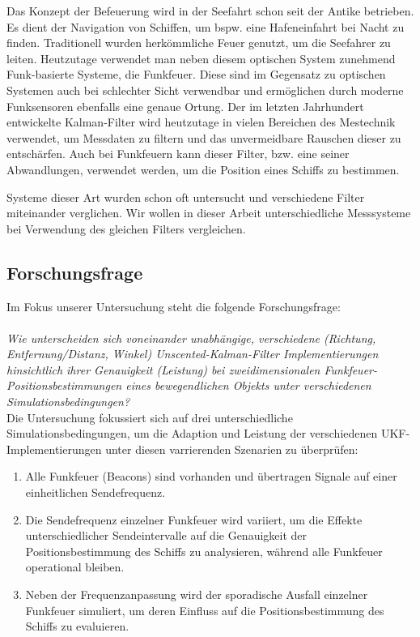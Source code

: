 \documentclass[conference]{IEEEtran}[10pt]
\begin{document}
Das Konzept der Befeuerung wird in der Seefahrt schon seit der Antike betrieben. Es dient der Navigation von Schiffen, um bspw. eine Hafeneinfahrt bei Nacht zu finden. Traditionell wurden herkömmliche Feuer genutzt, um die Seefahrer zu leiten. Heutzutage verwendet man neben diesem optischen System zunehmend Funk-basierte Systeme, die Funkfeuer. Diese sind im Gegensatz zu optischen Systemen auch bei schlechter Sicht verwendbar und ermöglichen durch moderne Funksensoren ebenfalls eine genaue Ortung.
Der im letzten Jahrhundert entwickelte Kalman-Filter wird heutzutage in vielen Bereichen des Mestechnik verwendet, um Messdaten zu filtern und das unvermeidbare Rauschen dieser zu entschärfen. Auch bei Funkfeuern kann dieser Filter, bzw. eine seiner Abwandlungen, verwendet werden, um die Position eines Schiffs zu bestimmen.

Systeme dieser Art wurden schon oft untersucht und verschiedene Filter miteinander verglichen. Wir wollen in dieser Arbeit unterschiedliche Messsysteme bei Verwendung des gleichen Filters vergleichen.




\subsection{Forschungsfrage}

Im Fokus unserer Untersuchung steht die folgende Forschungsfrage:
\\\\
\textit{Wie unterscheiden sich voneinander unabhängige, verschiedene (Richtung, Entfernung/Distanz, Winkel) Unscented-Kalman-Filter Implementierungen hinsichtlich ihrer Genauigkeit (Leistung) bei zweidimensionalen Funkfeuer-Positionsbestimmungen eines bewegendlichen Objekts unter verschiedenen Simulationsbedingungen?}
\\

Die Untersuchung fokussiert sich auf drei unterschiedliche Simulationsbedingungen, um die Adaption und Leistung der verschiedenen UKF-Implementierungen unter diesen varrierenden Szenarien zu überprüfen:

\begin{enumerate}
\item Alle Funkfeuer (Beacons) sind vorhanden und übertragen Signale auf einer einheitlichen Sendefrequenz.

\item Die Sendefrequenz einzelner Funkfeuer wird variiert, um die Effekte unterschiedlicher Sendeintervalle auf die Genauigkeit der Positionsbestimmung des Schiffs zu analysieren, während alle Funkfeuer operational bleiben.

\item Neben der Frequenzanpassung wird der sporadische Ausfall einzelner Funkfeuer simuliert, um deren Einfluss auf die Positionsbestimmung des Schiffs zu evaluieren.

\end{enumerate}
\end{document}
